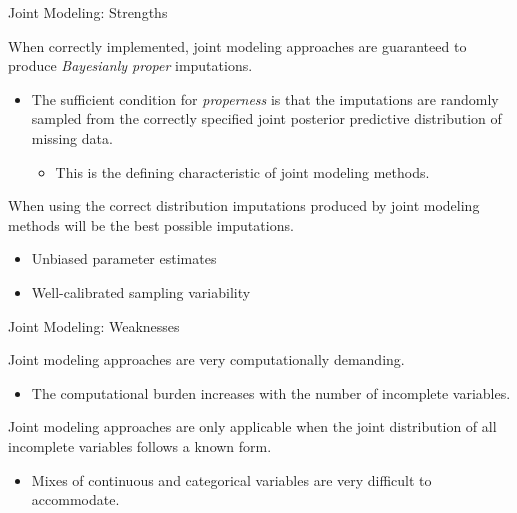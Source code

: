 \documentclass{beamer}\usepackage[]{graphicx}\usepackage[]{color}
\begin{document}

\begin{frame}[allowframebreaks]{Joint Modeling: Strengths}
  
  When correctly implemented, joint modeling approaches are guaranteed to 
  produce \emph{Bayesianly proper} imputations.
  \vb
  \begin{itemize}
  \item The sufficient condition for \emph{properness} is that the imputations 
    are randomly sampled from the correctly specified joint posterior predictive 
    distribution of missing data.
    \vc
    \begin{itemize}
    \item This is the defining characteristic of joint modeling methods.
    \end{itemize}
  \end{itemize}
  \va
  When using the correct distribution imputations produced by joint modeling 
  methods will be the best possible imputations.
  \begin{itemize}
  \item Unbiased parameter estimates
  \item Well-calibrated sampling variability
  \end{itemize}
  
\end{frame}


\begin{frame}{Joint Modeling: Weaknesses}
  
  Joint modeling approaches are very computationally demanding.
  \vc
  \begin{itemize}
  \item The computational burden increases with the number of incomplete 
    variables.
  \end{itemize}
  \va
  Joint modeling approaches are only applicable when the joint distribution of 
  all incomplete variables follows a known form.
  \vc
  \begin{itemize}
  \item Mixes of continuous and categorical variables are very difficult to 
    accommodate.
  \end{itemize}
  
\end{frame}
\end{document}
